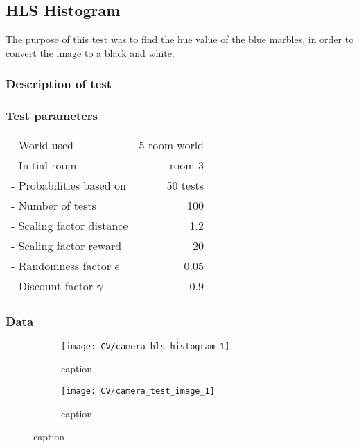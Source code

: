 \documentclass[../Head/Main.tex]{subfiles}
\begin{document}
\subsection{HLS Histogram}
\label{subsec:test_HLS_hist}
The purpose of this test was to find the hue value of the blue marbles, in order to convert the image to a black and white. 

\subsubsection*{Description of test}



\subsubsection*{Test parameters}
\begin{minipage}[c]{0.35\textwidth}
	\begin{tabular}{l r}
	- World used                   & 5-room world\\
	- Initial room                 & room 3\\	
	- Probabilities based on       & 50 tests\\	
	- Number of tests              & 100\\
	- Scaling factor distance      & 1.2\\
	- Scaling factor reward        & 20\\
	- Randomness factor $\epsilon$ & 0.05\\
	- Discount factor $\gamma$     & 0.9\\
	\end{tabular}
\end{minipage}	

\subsubsection*{Data}
\begin{figure}[H]
	\centering
	\begin{subfigure}[b]{0.48\textwidth}
		\centering
		\texttt{[image: CV/camera\_hls\_histogram\_1]}
		\caption{caption}
	\end{subfigure}
	\hfill
	\begin{subfigure}[b]{0.5\textwidth}
		\centering
		\texttt{[image: CV/camera\_test\_image\_1]}
		\caption{caption}
	\end{subfigure}
	\caption{caption}
\end{figure}
\end{document}

